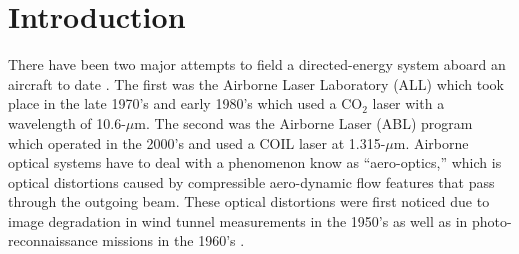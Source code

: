
\chapter{Introduction}
\label{chap:01_intro}

There have been two major attempts to field a directed-energy system aboard an aircraft to date \cite{Jumper-2013-8KtN3pue}.
The first was the Airborne Laser Laboratory (ALL) which took place in the late 1970's and early 1980's which used a CO$_2$ laser with a wavelength of 10.6-$\mu$m.
The second was the Airborne Laser (ABL) program which operated in the 2000's and used a COIL laser at 1.315-$\mu$m.
Airborne optical systems have to deal with a phenomenon know as ``aero-optics,'' which is optical distortions caused by compressible aero-dynamic flow features that pass through the outgoing beam.
These optical distortions were first noticed due to image degradation in wind tunnel measurements in the 1950's \cite{Stine-1956-UaRzVZCe} as well as in photo-reconnaissance missions in the 1960's \cite{Kyrazis-2013-vwKeEBym}.

